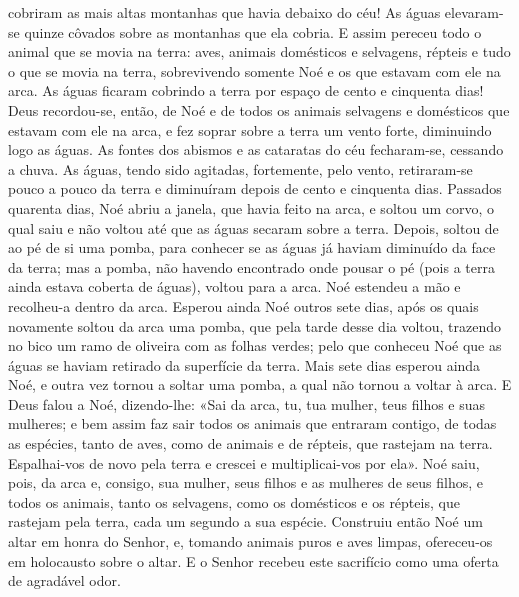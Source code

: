 \begin{paracol}{2}
{cobriram as mais altas montanhas que havia debaixo do céu! As águas elevaram-se quinze côvados sobre as montanhas que ela cobria. E assim pereceu todo o animal que se movia na terra: aves, animais domésticos e selvagens, répteis e tudo o que se movia na terra, sobrevivendo somente Noé e os que estavam com ele na arca. As águas ficaram cobrindo a terra por espaço de cento e cinquenta dias! Deus recordou-se, então, de Noé e de todos os animais selvagens e domésticos que estavam com ele na arca, e fez soprar sobre a terra um vento forte, diminuindo logo as águas. As fontes dos abismos e as cataratas do céu fecharam-se, cessando a chuva. As águas, tendo sido agitadas, fortemente, pelo vento, retiraram-se pouco a pouco da terra e diminuíram depois de cento e cinquenta dias. Passados quarenta dias, Noé abriu a janela, que havia feito na arca, e soltou um corvo, o qual saiu e não voltou até que as águas secaram sobre a terra. Depois, soltou de ao pé de si uma pomba, para conhecer se as águas já haviam diminuído da face da terra; mas a pomba, não havendo encontrado onde pousar o pé (pois a terra ainda estava coberta de águas), voltou para a arca. Noé estendeu a mão e recolheu-a dentro da arca. Esperou ainda Noé outros sete dias, após os quais novamente soltou da arca uma pomba, que pela tarde desse dia voltou, trazendo no bico um ramo de oliveira com as folhas verdes; pelo que conheceu Noé que as águas se haviam retirado da superfície da terra. Mais sete dias esperou ainda Noé, e outra vez tornou a soltar uma pomba, a qual não tornou a voltar à arca. E Deus falou a Noé, dizendo-lhe: «Sai da arca, tu, tua mulher, teus filhos e suas mulheres; e bem assim faz sair todos os animais que entraram contigo, de todas as espécies, tanto de aves, como de animais e de répteis, que rastejam na terra. Espalhai-vos de novo pela terra e crescei e multiplicai-vos por ela». Noé saiu, pois, da arca e, consigo, sua mulher, seus filhos e as mulheres de seus filhos, e todos os animais, tanto os selvagens, como os domésticos e os répteis, que rastejam pela terra, cada um segundo a sua espécie. Construiu então Noé um altar em honra do Senhor, e, tomando animais puros e aves limpas, ofereceu-os em holocausto sobre o altar. E o Senhor recebeu este sacrifício como uma oferta de agradável odor.
}\switchcolumn*{}\switchcolumn{}\switchcolumn*\latim{
}
\end{paracol}
